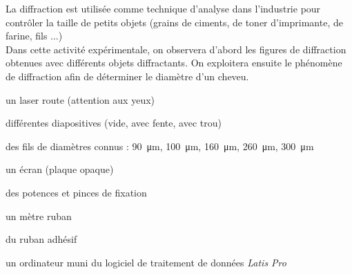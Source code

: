 \documentclass[a4paper,11pt,fleqn]{article}%
\begin{document}
\maketitle

La diffraction est utilisée comme technique d'analyse dans l'industrie pour contrôler la taille de petits objets (grains de ciments, de toner d'imprimante, de farine, fils ...)\\
Dans cette activité expérimentale, on observera d'abord les figures de diffraction obtenues avec différents objets diffractants. On exploitera ensuite le phénomène de diffraction afin de déterminer le diamètre d'un cheveu.\\
\noindent
\begin{minipage}[t]{.44\textwidth}
\begin{materiel}
\begin{itemize*}
    \item un laser route (attention aux yeux)
    \item différentes diapositives (vide, avec fente, avec trou)
    \item des fils de diamètres connus : \SI{90}{\micro\meter}, \SI{100}{\micro\meter}, \SI{160}{\micro\meter}, \SI{260}{\micro\meter}, \SI{300}{\micro\meter}
    \item un écran (plaque opaque)
    \item des potences et pinces de fixation
    \item un mètre ruban
    \item du ruban adhésif
    \item un ordinateur muni du logiciel de traitement de données \textit{Latis Pro}
\end{itemize*}
\end{materiel}
\end{minipage}
\end{document}
